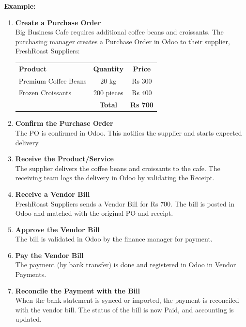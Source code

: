 \documentclass[11pt,a4paper]{article}
\begin{document}
\medskip
\noindent\textbf{Example:}
\begin{enumerate}
    \item \textbf{Create a Purchase Order} \\
    Big Business Cafe requires additional coffee beans and croissants. The purchasing manager creates a Purchase Order in Odoo to their supplier, FreshRoast Suppliers: \\
    \begin{tabular}{l c c}
        \textbf{Product} & \textbf{Quantity} & \textbf{Price} \\
        Premium Coffee Beans & 20 kg & Rs 300 \\
        Frozen Croissants & 200 pieces & Rs 400 \\
        & \textbf{Total} & \textbf{Rs 700} \\
    \end{tabular}

    \item \textbf{Confirm the Purchase Order} \\
    The PO is confirmed in Odoo. This notifies the supplier and starts expected delivery.

    \item \textbf{Receive the Product/Service} \\
    The supplier delivers the coffee beans and croissants to the cafe. The receiving team logs the delivery in Odoo by validating the Receipt.

    \item \textbf{Receive a Vendor Bill} \\
    FreshRoast Suppliers sends a Vendor Bill for Rs 700. The bill is posted in Odoo and matched with the original PO and receipt.

    \item \textbf{Approve the Vendor Bill} \\
    The bill is validated in Odoo by the finance manager for payment.

    \item \textbf{Pay the Vendor Bill} \\
    The payment (by bank transfer) is done and registered in Odoo in Vendor Payments.

    \item \textbf{Reconcile the Payment with the Bill} \\
    When the bank statement is synced or imported, the payment is reconciled with the vendor bill. The status of the bill is now Paid, and accounting is updated.
\end{enumerate}
\end{document}
